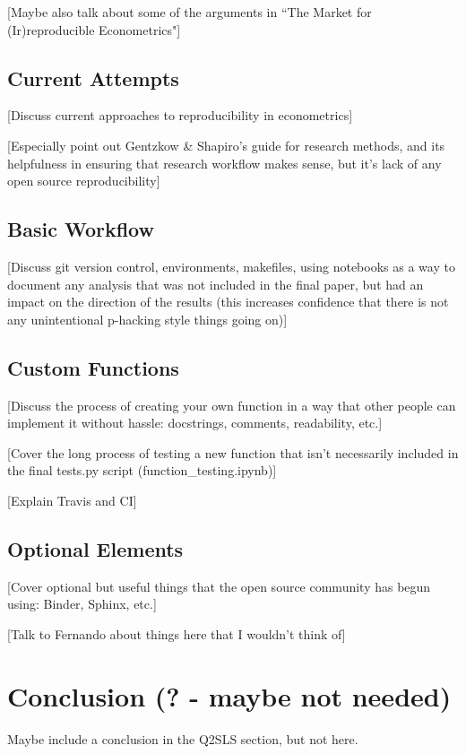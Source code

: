 \documentclass[12pt]{article}
\begin{document}
\textcolor{BrickRed}{[Maybe also talk about some of the arguments in ``The Market for (Ir)reproducible Econometrics"]}

\subsection{Current Attempts}
\textcolor{BrickRed}{[Discuss current approaches to reproducibility in econometrics]}

\textcolor{BrickRed}{[Especially point out Gentzkow \& Shapiro's guide for research methods, and its helpfulness in ensuring that research workflow makes sense, but it's lack of any open source reproducibility]}

\subsection{Basic Workflow}
\textcolor{BrickRed}{[Discuss git version control, environments, makefiles, using notebooks as a way to document any analysis that was not included in the final paper, but had an impact on the direction of the results (this increases confidence that there is not any unintentional p-hacking style things going on)]}

\subsection{Custom Functions}
\textcolor{BrickRed}{[Discuss the process of creating your own function in  a way that other people can implement it without hassle: docstrings, comments, readability, etc.]}

\textcolor{BrickRed}{[Cover the long process of testing a new function that isn't necessarily included in the final tests.py script (function\_testing.ipynb)]}

\textcolor{BrickRed}{[Explain Travis and CI]}

\subsection{Optional Elements}
\textcolor{BrickRed}{[Cover optional but useful things that the open source community has begun using: Binder, Sphinx, etc.]}

\textcolor{BrickRed}{[Talk to Fernando about things here that I wouldn't think of]}


\newpage
\section{Conclusion (? - maybe not needed)}
Maybe include a conclusion in the Q2SLS section, but not here.
\end{document}
